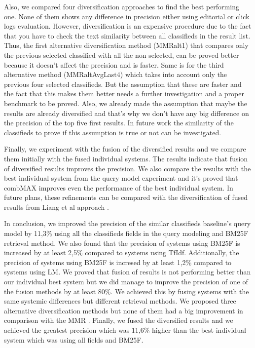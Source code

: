 Also, we compared four diversification approaches to find the best performing one. None of them shows any difference in precision either using editorial or click logs evaluation. However, diversification is an expensive procedure due to the fact that you have to check the text similarity between all classifieds in the result list. Thus, the first alternative diversification method (MMRalt1) that compares only the previous selected classified with all the non selected, can be proved better because it doesn't affect the precision and is faster. Same is for the third alternative method (MMRaltAvgLast4) which takes into account only the previous four selected classifieds. But the assumption that these are faster and the fact that this makes them better needs a further investigation and a proper benchmark to be proved. Also, we already made the assumption that maybe the results are already diversified and that's why we don't have any big difference on the precision of the top five first results. In future work the similarity of the classifieds to prove if this assumption is true or not can be investigated.

Finally, we experiment with the fusion of the diversified results and we compare them initially with the fused individual systems. The results indicate that fusion of diversified results improves the precision. We also compare the results with the best individual system from the query model experiment and it's proved that combMAX improves even the performance of the best individual system. In future plans, these refinements can be compared with the diversification of fused results from Liang et al approach \cite{LiangRenMaarten}.


In conclusion, we improved the precision of the similar classifieds baseline's query model by 11,3\% using all the classifieds fields in the query modeling and BM25F retrieval method. We also found that the precision of systems using BM25F is increased by at least 2,5\% compared to systems using TfIdf. Additionally, the precision of systems using BM25F is incresed by at least 1,2\% compared to systems using LM. We proved that fusion of results is not performing better than our individual best system but we did manage to improve the precision of one of the fusion methods by at least 80\%. We achieved this by fusing systems with the same systemic differences but different retrieval methods. We proposed three alternative diversification methods but none of them had a big improvement in comparison with the MMR \cite{CarbonellGoldstein}. Finally, we fused the diversified results and we achieved the greatest precision which was 11,6\% higher than the best individual system which was using all fields and BM25F. 
